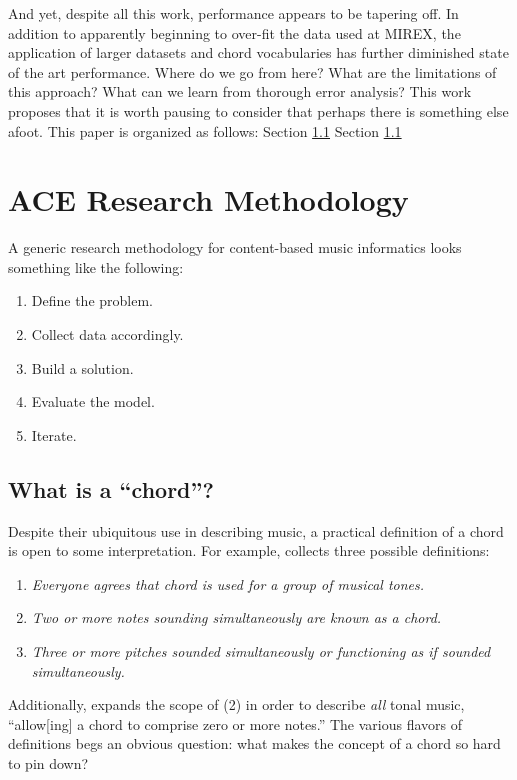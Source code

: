 \documentclass{article}
\begin{document}
And yet, despite all this work, performance appears to be tapering off.
In addition to apparently beginning to over-fit the data used at MIREX, the application of larger datasets and chord vocabularies has further diminished state of the art performance.
Where do we go from here?
What are the limitations of this approach?
What can we learn from thorough error analysis?
This work proposes that it is worth pausing to consider that perhaps there is something else afoot.
This paper is organized as follows:
Section \ref{}
Section \ref{}


\section{ACE Research Methodology}

A generic research methodology for content-based music informatics looks something like the following:

\begin{enumerate}
\item Define the problem.
\item Collect data accordingly.
\item Build a solution.
\item Evaluate the model.
\item Iterate.
\end{enumerate}


\subsection{What is a ``chord''?}

Despite their ubiquitous use in describing music, a practical definition of a chord is open to some interpretation.
For example, \cite{McVicar2013Machine} collects three possible definitions:

\begin{enumerate}
\item \emph{Everyone agrees that \emph{chord} is used for a group of musical tones.}
\item \emph{Two or more notes sounding simultaneously are known as a chord.}
\item \emph{Three or more pitches sounded simultaneously or functioning as if sounded simultaneously.}
\end{enumerate}

\noindent Additionally, \cite{Harte2010Towards} expands the scope of (2) in order to describe \emph{all} tonal music, ``allow[ing] a chord to comprise zero or more notes.''
The various flavors of definitions begs an obvious question:
what makes the concept of a chord so hard to pin down?
\end{document}
